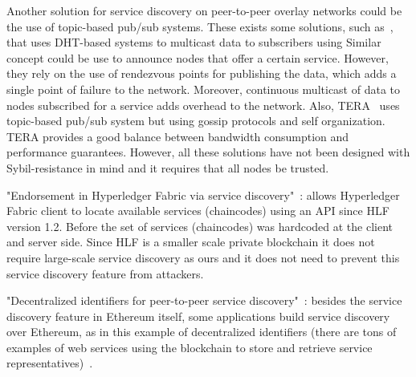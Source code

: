 Another solution for service discovery on peer-to-peer overlay networks could be the use of topic-based pub/sub systems. 
These exists some solutions,  such as~\cite{scribe,poldercast,banno2015},  that uses DHT-based systems to multicast data to subscribers using 
Similar concept could be use to announce nodes that offer a certain service.
However,  they rely on the use of rendezvous points for publishing the data,  which adds a single point of failure to the network.
Moreover,  continuous multicast of data to nodes subscribed for a service adds overhead to the network.
Also, TERA~\cite{baldoni2007tera} uses topic-based pub/sub system
but using gossip protocols and self organization.  TERA provides a good balance between bandwidth consumption and performance guarantees. 
However,  all these solutions have not been designed with Sybil-resistance in mind and it requires that all nodes be trusted.



"Endorsement in Hyperledger Fabric via service discovery"~\cite{manevich2019endorsement}: allows Hyperledger Fabric client to locate available services (chaincodes) using an API since HLF version 1.2. Before the set of services (chaincodes) was hardcoded at the client and server side. Since HLF is a smaller scale private blockchain it does not require large-scale service discovery as ours and it does not need to prevent this service discovery feature from attackers.

"Decentralized identifiers for peer-to-peer service discovery"~\cite{farmer2021decentralized}: besides the service discovery feature in Ethereum itself, some applications build service discovery over Ethereum, as in this example of decentralized identifiers (there are tons of examples of web services using the blockchain to store and retrieve service representatives)~\cite{keizer2021flock}.








